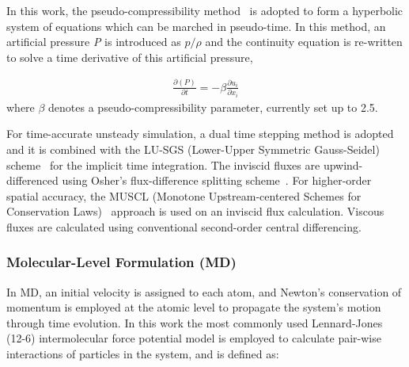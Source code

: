 \documentclass[preprint,12pt]{elsarticle}
\begin{document}
In this work, the pseudo-compressibility method~\cite{PseudoCompressibility} is adopted to form a hyperbolic system of equations which can be marched in pseudo-time. In this method, an artificial pressure \textit{P} is introduced as $p/\rho$ and the continuity equation is re-written to solve a time derivative of this artificial pressure,

\vspace{-.2em}
\begin{eqnarray}
\frac{\partial (P)}{\partial t} = - \beta \frac{\partial {u}_{i}}{\partial {x}_{i}}
\label{eq:Pseudo}
\end{eqnarray}
where $\beta$ denotes a pseudo-compressibility parameter, currently set up to 2.5.

For time-accurate unsteady simulation, a dual time stepping method is adopted and it is combined with the LU-SGS (Lower-Upper Symmetric Gauss-Seidel) scheme~\cite{LU-SGS} for the implicit time integration. The inviscid fluxes are upwind-differenced using Osher's flux-difference splitting scheme~\cite{Osher}. For higher-order spatial accuracy, the MUSCL (Monotone Upstream-centered Schemes for Conservation Laws)~\cite{MUSCL} approach is used on an inviscid flux calculation. Viscous fluxes are calculated using conventional second-order central differencing.



\subsubsection{Molecular-Level Formulation (MD)}
\label{sec:numerical_MDschemes}

In MD, an initial velocity is assigned to each atom, and Newton's conservation of momentum is employed at the atomic level to propagate the system's motion through time evolution. In this work the most commonly used Lennard-Jones (12-6) intermolecular force potential model is employed to calculate pair-wise interactions of particles in the system, and is defined as: 
\end{document}
